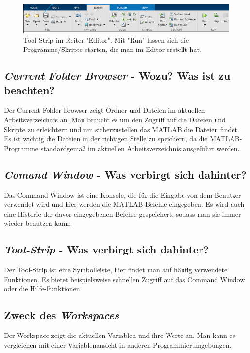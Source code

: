 \documentclass{article}
\begin{document}
			\begin{figure}
				\includegraphics[scale=0.45]{TOOLStrip_Editor.png}
				\caption{Tool-Strip im Reiter "Editor". Mit "Run" lassen sich die Programme/Skripte starten, die man im Editor erstellt hat.}
				\label{fig3: ToolStrip_Home}
			\end{figure}	
		
		\subsection{\textit{Current Folder Browser} - Wozu? Was ist zu beachten?}
			Der Current Folder Browser zeigt Ordner und Dateien im aktuellen Arbeitsverzeichnis an. Man braucht es um den Zugriff auf die Dateien und Skripte zu erleichtern und um sicherzustellen das MATLAB die Dateien findet. Es ist wichtig die Dateien in der richtigen Stelle zu speichern, da die MATLAB-Programme standardgemäß im aktuellen Arbeitsverzeichnis ausgeführt werden. 
		
		\subsection{\textit{Comand Window} - Was verbirgt sich dahinter?}
			Das Command Window ist eine Konsole, die für die Eingabe von dem Benutzer verwendet wird und hier werden die MATLAB-Befehle eingegeben. Es wird auch eine Historie der davor eingegebenen Befehle gespeichert, sodass man sie immer wieder benutzen kann. 
			
		\subsection{\textit{Tool-Strip} - Was verbirgt sich dahinter?}
			Der Tool-Strip ist eine Symbolleiste, hier findet man auf häufig verwendete Funktionen. Es bietet beispielsweise schnellen Zugriff auf das Command Window oder die Hilfe-Funktionen. 
		
		\subsection{Zweck des \textit{Workspaces}}
			Der Workspace zeigt die aktuellen Variablen und ihre Werte an. Man kann es vergleichen mit einer Variablenansicht in anderen Programmierumgebungen. 
		
\end{document}
